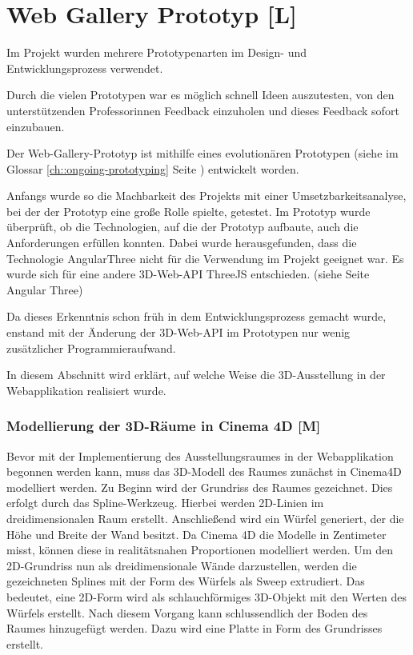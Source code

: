 \section{Web Gallery Prototyp [L]}
Im Projekt wurden mehrere Prototypenarten im Design- und Entwicklungsprozess verwendet.


Durch die vielen Prototypen war es möglich schnell Ideen auszutesten, von den unterstützenden Professorinnen Feedback einzuholen und dieses Feedback sofort einzubauen.


Der Web-Gallery-Prototyp ist mithilfe eines evolutionären Prototypen (siehe im Glossar \ref{ch::ongoing-prototyping} Seite \pageref{ch::ongoing-prototyping}) entwickelt worden.


Anfangs wurde so die Machbarkeit des Projekts mit einer Umsetzbarkeitsanalyse, bei der der Prototyp eine große Rolle spielte, getestet. Im Prototyp wurde überprüft, ob die Technologien, auf die der Prototyp aufbaute, auch die Anforderungen erfüllen konnten. Dabei wurde herausgefunden, dass die Technologie AngularThree nicht für die Verwendung im Projekt geeignet war. Es wurde sich für eine andere 3D-Web-API ThreeJS entschieden. (siehe Seite \pageref{ch:Technologien:AngularThree} Angular Three)


Da dieses Erkenntnis schon früh in dem Entwicklungsprozess gemacht wurde, enstand mit der Änderung der 3D-Web-API im Prototypen nur wenig zusätzlicher Programmieraufwand.


In diesem Abschnitt wird erklärt, auf welche Weise die 3D-Ausstellung in der Webapplikation realisiert wurde.

\subsubsection{Modellierung der 3D-Räume in Cinema 4D [M]}
Bevor mit der Implementierung des Ausstellungsraumes in der Webapplikation begonnen werden kann, muss das 3D-Modell des Raumes zunächst in Cinema4D modelliert werden. Zu Beginn wird der Grundriss des Raumes gezeichnet. Dies erfolgt durch das Spline-Werkzeug. Hierbei werden 2D-Linien im dreidimensionalen Raum erstellt. Anschließend wird ein Würfel generiert, der die Höhe und Breite der Wand besitzt. Da Cinema 4D die Modelle in Zentimeter misst, können diese in realitätsnahen Proportionen modelliert werden. Um den 2D-Grundriss nun als dreidimensionale Wände darzustellen, werden die gezeichneten Splines mit der Form des Würfels als Sweep extrudiert. Das bedeutet, eine 2D-Form wird als schlauchförmiges 3D-Objekt mit den Werten des Würfels erstellt. Nach diesem Vorgang kann schlussendlich der Boden des Raumes hinzugefügt werden. Dazu wird eine Platte in Form des Grundrisses erstellt. 

